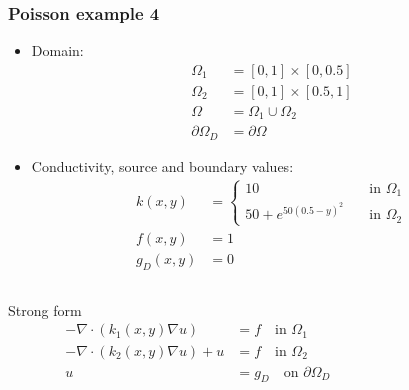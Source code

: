 \begin{frame}[shrink=20]
  \frametitle{Poisson example 4}
    \begin{itemize}
      \item Domain: \vspace{-1em}
        \begin{align*}
            \Omega_1 &= [0,1]\times[0,0.5] 
            \\
            \Omega_2 &= [0,1]\times[0.5,1] 
            \\
            \Omega &= \Omega_1 \cup \Omega_2 \\
        \partial \Omega_D &= \partial \Omega
        \end{align*}
      \item  Conductivity, source and boundary values: 
        \vspace{-0.5em}
        \begin{align*}
            k(x,y) &= 
            \begin{cases}
                10 &\quad \text{in } \Omega_1  \\ 
                50 + e^{50(0.5 - y )^2} &\quad \text{in } \Omega_2
            \end{cases}
            \\
          f(x,y) &= 1
          \\
          g_D(x,y) &= 0 
        \end{align*}
    \end{itemize}
    \vspace{-1em}
    \begin{columns}[t]
      \begin{column}{0.5\textwidth}
        \begin{block}{Strong form}
          \vspace{-2em}
          \begin{align*}
            -\nabla \cdot (k_1(x,y) \nabla u) &= f \quad \text{in } \Omega_1 \\
            -\nabla \cdot (k_2(x,y) \nabla u) + u  &= f \quad \text{in } \Omega_2 \\
                    u &= g_D \quad \text{on } \partial \Omega_D \\
          \end{align*}
        \end{block}
      \end{column}
      \begin{column}{0.5\textwidth}
\end{column}
\end{columns}
\end{frame}
